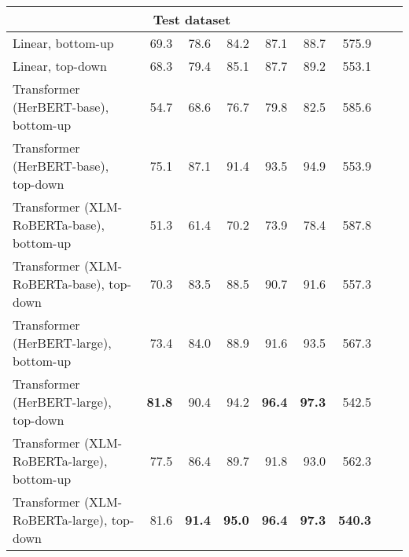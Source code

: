 \begin{table}[ht!]
{\begin{tabular}{lrrrrrrrr}
   \hline \multicolumn{7}{c}{\textbf{Test dataset}} \\ \hline
Linear, bottom-up & 69.3 & 78.6 & 84.2 & 87.1 & 88.7 & 575.9 \\ 
  Linear, top-down & 68.3 & 79.4 & 85.1 & 87.7 & 89.2 & 553.1 \\ 
  Transformer (HerBERT-base), bottom-up & 54.7 & 68.6 & 76.7 & 79.8 & 82.5 & 585.6 \\ 
  Transformer (HerBERT-base), top-down & 75.1 & 87.1 & 91.4 & 93.5 & 94.9 & 553.9 \\ 
  Transformer (XLM-RoBERTa-base), bottom-up & 51.3 & 61.4 & 70.2 & 73.9 & 78.4 & 587.8 \\ 
  Transformer (XLM-RoBERTa-base), top-down & 70.3 & 83.5 & 88.5 & 90.7 & 91.6 & 557.3 \\ 
  Transformer (HerBERT-large), bottom-up & 73.4 & 84.0 & 88.9 & 91.6 & 93.5 & 567.3 \\ 
  Transformer (HerBERT-large), top-down & \textbf{81.8} & 90.4 & 94.2 & \textbf{96.4} & \textbf{97.3} & 542.5 \\ 
  Transformer (XLM-RoBERTa-large), bottom-up & 77.5 & 86.4 & 89.7 & 91.8 & 93.0 & 562.3 \\ 
  Transformer (XLM-RoBERTa-large), top-down & 81.6 & \textbf{91.4} & \textbf{95.0} & \textbf{96.4} & \textbf{97.3} & \textbf{540.3} \\ 
   \hline
\end{tabular}
}
\end{table}




